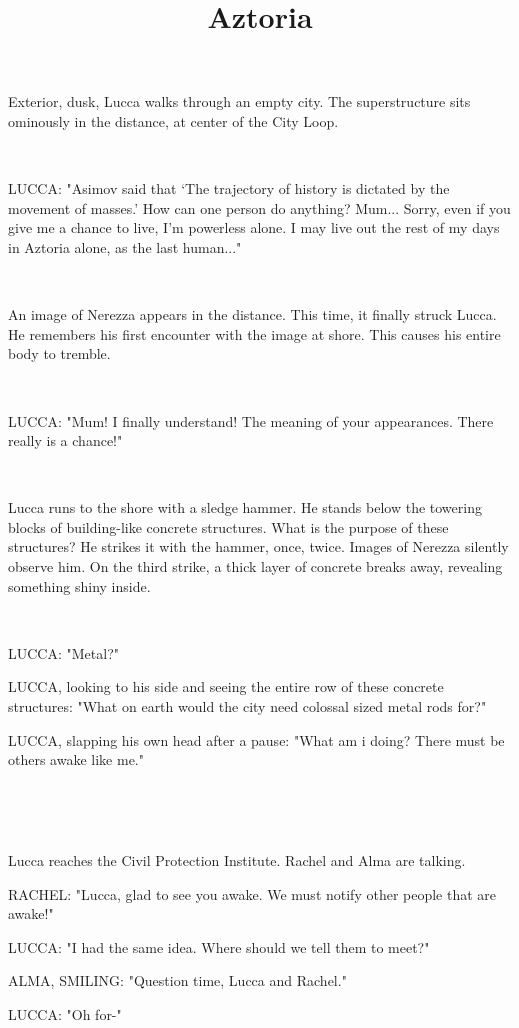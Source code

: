 \documentclass[11pt]{article}
\begin{document}
\ttfamily
\title{Aztoria}
\maketitle

Exterior, dusk, Lucca walks through an empty city.
The superstructure sits ominously in the distance, at center of the City Loop.

\ 

LUCCA: "Asimov said that `The trajectory of history is dictated by the movement of masses.' 
How can one person do anything?
Mum...
Sorry, even if you give me a chance to live, I'm powerless alone.
I may live out the rest of my days in Aztoria alone, as the last human..."

\ 

An image of Nerezza appears in the distance. 
This time, it finally struck Lucca.
He remembers his first encounter with the image at shore.
This causes his entire body to tremble.

\ 

LUCCA: "Mum! I finally understand! The meaning of your appearances. There really is a chance!"

\ 

Lucca runs to the shore with a sledge hammer. 
He stands below the towering blocks of building-like concrete structures.
What is the purpose of these structures?
He strikes it with the hammer, once, twice.
Images of Nerezza silently observe him.
On the third strike, a thick layer of concrete breaks away, revealing something shiny inside.

\ 

LUCCA: "Metal?"

LUCCA, looking to his side and seeing the entire row of these concrete structures: "What on earth would the city need colossal sized metal rods for?"

LUCCA, slapping his own head after a pause: "What am i doing? 
There must be others awake like me."

\ 

\ 

Lucca reaches the Civil Protection Institute.
Rachel and Alma are talking.

RACHEL: "Lucca, glad to see you awake. 
We must notify other people that are awake!"

LUCCA: "I had the same idea. 
Where should we tell them to meet?"

ALMA, SMILING: "Question time, Lucca and Rachel."

LUCCA: "Oh for-"
\end{document}
